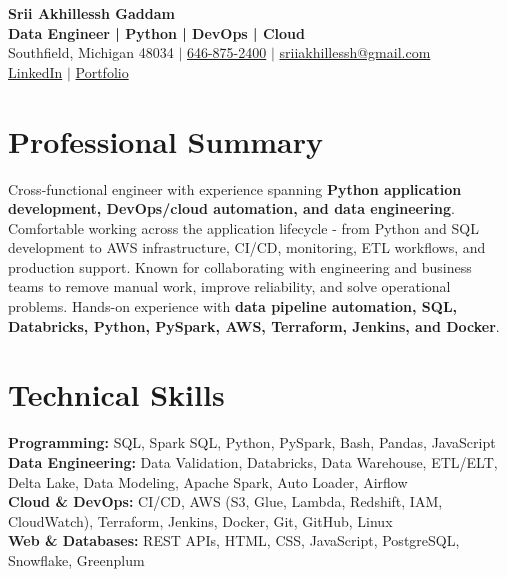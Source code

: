 \documentclass[letterpaper,10pt]{article}
\begin{document}
\fontsize{9.35pt}{10.45pt}\selectfont

\begin{center}
    {\LARGE \textbf{Srii Akhillessh Gaddam}} \\[-1pt]
    \textbf{Data Engineer | Python | DevOps | Cloud} \\[2pt]
    Southfield, Michigan 48034 $|$
    \href{tel:6468752400}{646-875-2400} $|$
    \href{mailto:sriiakhillessh@gmail.com}{sriiakhillessh@gmail.com} \\[1pt]
    \href{https://www.linkedin.com/in/srii-akhiilessh-gaddam-b48668191/}{LinkedIn} $|$
    \href{https://sriiakhillesshg.github.io/portfolio/}{Portfolio}
\end{center}
\vspace{-8pt}

\section{Professional Summary}
\small{Cross-functional engineer with experience spanning \textbf{Python application development, DevOps/cloud automation, and data engineering}. Comfortable working across the application lifecycle - from Python and SQL development to AWS infrastructure, CI/CD, monitoring, ETL workflows, and production support. Known for collaborating with engineering and business teams to remove manual work, improve reliability, and solve operational problems. Hands-on experience with \textbf{data pipeline automation, SQL, Databricks, Python, PySpark, AWS, Terraform, Jenkins, and Docker}.}

\section{Technical Skills}
\small{
\textbf{Programming:} SQL, Spark SQL, Python, PySpark, Bash, Pandas, JavaScript \\
\textbf{Data Engineering:} Data Validation, Databricks, Data Warehouse, ETL/ELT, Delta Lake, Data Modeling, Apache Spark, Auto Loader, Airflow \\
\textbf{Cloud \& DevOps:} CI/CD, AWS (S3, Glue, Lambda, Redshift, IAM, CloudWatch), Terraform, Jenkins, Docker, Git, GitHub, Linux \\
\textbf{Web \& Databases:} REST APIs, HTML, CSS, JavaScript, PostgreSQL, Snowflake, Greenplum
}
\end{document}
